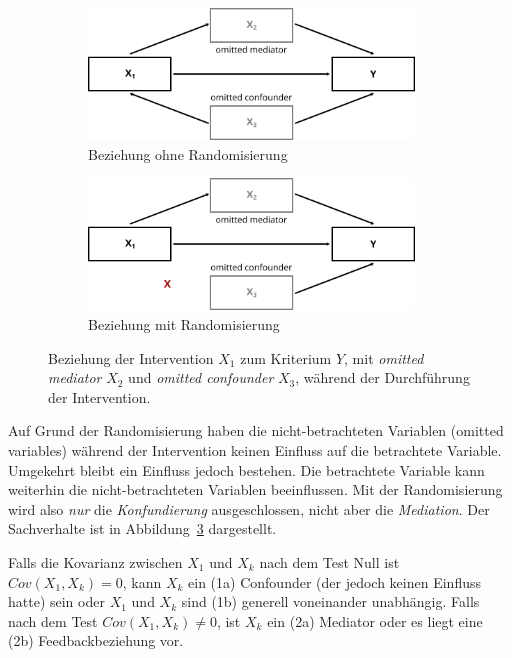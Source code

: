 \documentclass{article}
\numberwithin{equation}{section}
\begin{document}
\begin{figure}
  \centering
  \captionsetup{justification=centering}
  \begin{subfigure}[b]{0.47\textwidth}
    \centering
    \includegraphics[width=0.95\textwidth]{images/kausal/ohne-randomisierung.png}
    \caption{Beziehung ohne Randomisierung}
    \label{img:rando-ohne}
  \end{subfigure}
  \begin{subfigure}[b]{0.47\textwidth}
    \centering
    \includegraphics[width=0.95\textwidth]{images/kausal/mit-randomisierung.png}
    \caption{Beziehung mit Randomisierung}
    \label{img:rando-mit}
  \end{subfigure}
  \caption{Beziehung der Intervention $X_1$ zum Kriterium $Y$, mit \emph{omitted mediator} $X_2$ und \emph{omitted confounder} $X_3$, während der Durchführung der Intervention.}
  \label{img:rando}
\end{figure}

Auf Grund der Randomisierung haben die nicht-betrachteten Variablen (omitted variables) während der Intervention keinen Einfluss auf die betrachtete Variable. Umgekehrt bleibt ein Einfluss jedoch bestehen. Die betrachtete Variable kann weiterhin die nicht-betrachteten Variablen beeinflussen. Mit der Randomisierung wird also \emph{nur} die \emph{Konfundierung} ausgeschlossen, nicht aber die \emph{Mediation}. Der Sachverhalte ist in Abbildung~\ref{img:rando} dargestellt.

Falls die Kovarianz zwischen $X_1$ und $X_k$ nach dem Test Null ist $Cov(X_1,X_k) = 0$, kann $X_k$ ein (1a) Confounder (der jedoch keinen Einfluss hatte) sein oder $X_1$ und $X_k$ sind (1b) generell voneinander unabhängig. Falls nach dem Test $Cov(X_1,X_k) \neq 0$, ist $X_k$ ein (2a) Mediator oder es liegt eine (2b) Feedbackbeziehung vor.
\end{document}
